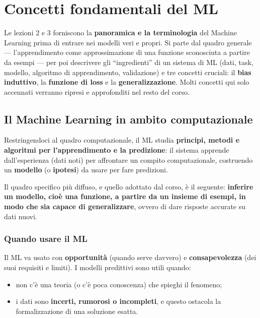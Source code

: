\chapter{Concetti fondamentali del ML}\label{ch-03}

Le lezioni 2 e 3 forniscono la \textbf{panoramica e la terminologia} del
Machine Learning prima di entrare nei modelli veri e propri. Si parte
dal quadro generale --- l'apprendimento come approssimazione di una
funzione sconosciuta a partire da esempi --- per poi descrivere gli
``ingredienti'' di un sistema di ML (dati, task, modello, algoritmo di
apprendimento, validazione) e tre concetti cruciali: il \textbf{bias
induttivo}, la \textbf{funzione di loss} e la \textbf{generalizzazione}.
Molti concetti qui solo accennati verranno ripresi e approfonditi nel
resto del corso.

\section{Il Machine Learning in ambito
computazionale}\label{il-machine-learning-in-ambito-computazionale}

Restringendoci al quadro computazionale, il ML studia \textbf{principi,
metodi e algoritmi per l'apprendimento e la predizione}: il sistema
apprende dall'esperienza (dati noti) per affrontare un compito
computazionale, costruendo un \textbf{modello} (o \textbf{ipotesi}) da
usare per fare predizioni.

Il quadro specifico più diffuso, e quello adottato dal corso, è il
seguente: \textbf{inferire un modello, cioè una funzione, a partire da
un insieme di esempi, in modo che sia capace di generalizzare}, ovvero
di dare risposte accurate su dati nuovi.

\subsection{Quando usare il ML}\label{quando-usare-il-ml}

Il ML va usato con \textbf{opportunità} (quando serve davvero) e
\textbf{consapevolezza} (dei suoi requisiti e limiti). I modelli
predittivi sono utili quando:

\begin{itemize}
\tightlist
\item
  non c'è una teoria (o c'è poca conoscenza) che spieghi il fenomeno;
\item
  i dati sono \textbf{incerti, rumorosi o incompleti}, e questo ostacola
  la formalizzazione di una soluzione esatta.
\end{itemize}

